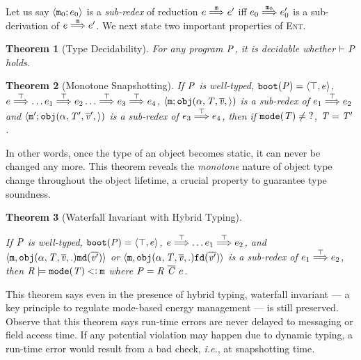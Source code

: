 \documentclass[onecolumn,nocopyrightspace]{sigplanconf}
\newtheorem{theorem}{Theorem} %
\theoremstyle{lessintrusive}
\theoremstyle{plain}
\theoremstyle{custom}
\theoremstyle{subcase-custom}
\newcommand{\ourlang}{\textsc{Ent}}
\begin{document}
Let us say $\langle\mathtt{m}_0;e_0\rangle$ is a \emph{sub-redex} of reduction $e \stackrel{\mathtt{m}}{\Longrightarrow} e'$ iff $e_0 \stackrel{\mathtt{m}_0}{\Longrightarrow} e'_0$ is a sub-derivation of $e \stackrel{\mathtt{m}}{\Longrightarrow} e'$. We next state two important properties of \ourlang{}. 

\begin{theorem}[Type Decidability]
\label{pf:typedecidability}
For any program $\mathit{P}$, it is decidable whether $\vdash \mathit{P}$ holds.
\end{theorem} 

\begin{theorem}[Monotone Snapshotting]

If $ \mathit{P}$ is well-typed, $\mathtt{boot}(\mathit{P}) = \langle\top,e\rangle$, $e \stackrel{\top}{\Longrightarrow} \dots e_1 \stackrel{\top}{\Longrightarrow} e_2 \dots\stackrel{\top}{\Longrightarrow} e_3 \stackrel{\top}{\Longrightarrow} e_4$,  $\langle\mathtt{m}; \mathtt{obj}( \alpha, \mathit{T},\overline{\mathit{v}},\rangle)$ is a sub-redex of $e_1 \stackrel{\top}{\Longrightarrow} e_2$ and $\langle\mathtt{m}'; \mathtt{obj}( \alpha, \mathit{T}',\overline{\mathit{v}}',\rangle)$ is a sub-redex of $e_3 \stackrel{\top}{\Longrightarrow} e_4$, then if $\mathtt{mode}(\mathit{T}) \neq \mathtt{?}$, $\mathit{T} = \mathit{T}'$. 
\end{theorem}

In other words, once the type of an object becomes static, it can never be changed any more. This theorem reveals the \emph{monotone} nature of object type change throughout the object lifetime, a crucial property to guarantee type soundness. 

\begin{theorem}[Waterfall Invariant with Hybrid Typing]
\label{pf:waterfallinvariant}

If $ \mathit{P}$ is well-typed, $\mathtt{boot}(\mathit{P}) = \langle\top,e\rangle$, $e \stackrel{\top}{\Longrightarrow} \dots e_1 \stackrel{\top}{\Longrightarrow} e_2$, and $\langle\mathtt{m},\mathtt{obj}(\alpha, \mathit{T},\overline{\mathit{v}},.)\mathtt{md}(\overline{\mathit{v}'})\rangle$ or $\langle\mathtt{m},\mathtt{obj}(\alpha, \mathit{T},\overline{\mathit{v}},.)\mathtt{fd}(\overline{\mathit{v}'})\rangle$ is a sub-redex of $e_1 \stackrel{\top}{\Longrightarrow} e_2$, then $\mathit{R} \models \mathtt{mode}(\mathit{T}) \mathbin{<\vcentcolon} \mathtt{m}$ where $\programcode = \rodef \ \overline{\classes} \ e$.
\end{theorem} 

This theorem says even in the presence of hybrid typing, waterfall invariant --- a key principle to regulate mode-based energy management --- is still preserved. Observe that this theorem says run-time errors are never delayed to messaging or field access time. If any potential violation may happen due to dynamic typing, a run-time error would result from a bad check, \emph{i.e.}, at snapshotting time.
\end{document}
